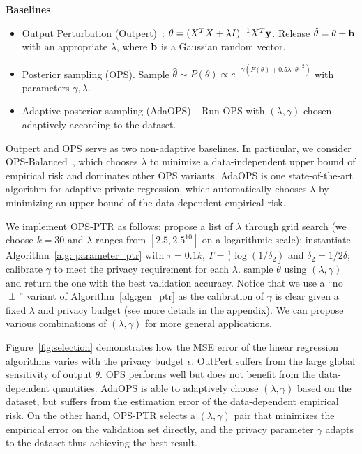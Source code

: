 \textbf{Baselines}
\begin{itemize}
    \item Output Perturbation (Outpert)~\citep{chaudhuri2011differentially}: $\theta=(X^TX + \lambda I)^{-1}X^T\bf{y}$. Release $\hat{\theta} = \theta + \bf{b}$ with an appropriate $\lambda$, where $\bf{b}$ is a Gaussian random vector.%
    \item Posterior sampling (OPS). Sample $\hat{\theta}\sim P(\theta)\propto e^{-\gamma(F(\theta)+ 0.5 \lambda ||\theta||^2)}$ with parameters $\gamma, \lambda$.%
    \item Adaptive posterior sampling (AdaOPS)~\citep{wang2018revisiting}. Run OPS with $(\lambda, \gamma)$ chosen adaptively according to the dataset.%
\end{itemize}
Outpert and OPS serve as two non-adaptive baselines. In particular, we consider OPS-Balanced~\citep{wang2018revisiting}, which chooses $\lambda$ to minimize a data-independent upper bound of empirical risk and dominates other OPS variants. 
AdaOPS is one state-of-the-art algorithm for adaptive private regression, which  automatically chooses $\lambda$ by minimizing an upper bound of the data-dependent empirical risk.


We implement OPS-PTR as follows: 
propose a list of $\lambda$ through grid search (we choose $k=30$ and $\lambda$ ranges from $[2.5, 2.5^{10}]$ on a logarithmic scale); instantiate Algorithm~\ref{alg: parameter_ptr} with $\tau =0.1k$, $T=\frac{1}{\tau} \log(1/\delta_2)$ and  $\delta_2 = 1/2 \delta$;
calibrate $\gamma$ to meet the privacy requirement for each $\lambda$. sample $\hat{\theta}$ using $(\lambda,\gamma)$ and return the one with the best validation accuracy. Notice that we use a ``no $\perp$'' variant of Algorithm~\ref{alg:gen_ptr} as the calibration of $\gamma$ is clear given a fixed $\lambda$ and privacy budget (see more details in the appendix). We can propose various combinations of $(\lambda, \gamma)$ for more general applications.


 Figure~\ref{fig:selection}  demonstrates how the MSE error of the linear regression algorithms varies with the privacy budget $\epsilon$. OutPert suffers from the large global sensitivity of output $\theta$. OPS performs well but does not benefit from the data-dependent quantities. AdaOPS is able to adaptively choose $(\lambda, \gamma)$ based on the dataset, but suffers from the estimation error of the data-dependent empirical risk. On the other hand, OPS-PTR selects a  $(\lambda, \gamma)$ pair that minimizes the empirical error on the validation set directly, and the privacy parameter $\gamma$ adapts to the dataset thus achieving the best result.
